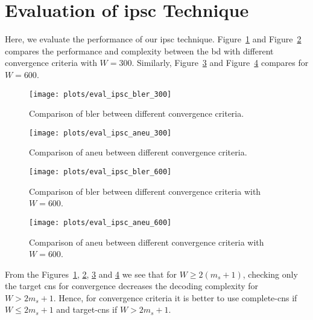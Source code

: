 \section{Evaluation of \texorpdfstring{\acrlong{ipsc}}{IPSC} Technique}
Here, we evaluate the performance of our \gls{ipsc} technique. Figure~\ref{fig:eval_ipsc_bler_300} and Figure~\ref{fig:eval_ipsc_aneu_300} compares the performance and complexity between the \gls{bd} with different convergence criteria with $W=300$. Similarly, Figure~\ref{fig:eval_ipsc_bler_600} and Figure~\ref{fig:eval_ipsc_aneu_600} compares for $W=600$.
\begin{figure}[htbp]
  \centering
  \texttt{[image: plots/eval\_ipsc\_bler\_300]}
  \caption[Comparison of \acrshort{bler} between different convergence criteria for $W=300$.]{Comparison of \gls{bler} between different convergence criteria.}
  \label{fig:eval_ipsc_bler_300}
\end{figure}
\begin{figure}[htbp]
  \centering
  \texttt{[image: plots/eval\_ipsc\_aneu\_300]}
  \caption[Comparison of \acrshort{aneu} between different convergence criteria for $W=300$.]{Comparison of \gls{aneu} between different convergence criteria.}
  \label{fig:eval_ipsc_aneu_300}
\end{figure}
\begin{figure}[htbp]
  \centering
  \texttt{[image: plots/eval\_ipsc\_bler\_600]}
  \caption[Comparison of \acrshort{bler} between different convergence criteria for $W=600$.]{Comparison of \gls{bler} between different convergence criteria with $W=600$.}
  \label{fig:eval_ipsc_bler_600}
\end{figure}
\begin{figure}[htbp]
  \centering
  \texttt{[image: plots/eval\_ipsc\_aneu\_600]}
  \caption[Comparison of \acrshort{aneu} between different convergence criteria for $W=600$.]{Comparison of \gls{aneu} between different convergence criteria with $W=600$.}
  \label{fig:eval_ipsc_aneu_600}
\end{figure}

From the Figures~\ref{fig:eval_ipsc_bler_300}, \ref{fig:eval_ipsc_aneu_300}, \ref{fig:eval_ipsc_bler_600} and \ref{fig:eval_ipsc_aneu_600} we see that for $W\geq2(m_s+1)$, checking only the target \glspl{cn} for convergence decreases the decoding complexity for $W>2m_s+1$. Hence, for convergence criteria it is better to use complete-\glspl{cn} if $W\leq2m_s+1$ and target-\glspl{cn} if $W>2m_s+1$.